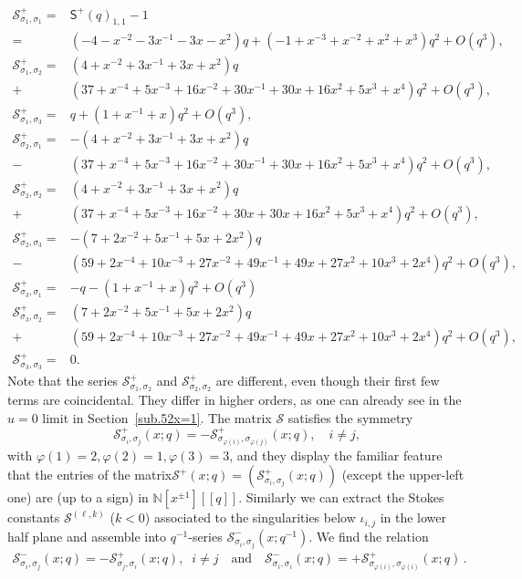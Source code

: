 \documentclass[12pt,reqno]{amsart}
\theoremstyle{definition}
\def\calS{\mathcal S}
\def\s{\sigma}
\def\mc{\mathcal}
\def\ms{\mathsf}
\def\cO{O}
\def\IN{\mathbb{N}}
\newcommand{\nn}{\nonumber \\}
\begin{document}
\begin{subequations}
\begin{align}
  \mc{S}^+_{\s_1,\s_1} =
  &\ms{S}^+(q)_{1,1}-1\nn=
  &(-4-x^{-2}-3x^{-1}-3 x-x^2) q+(-1+x^{-3}+x^{-2}+x^2+x^3) q^2+\cO(q^3),\\
  \mc{S}^+_{\s_1,\s_2} =
  &(4+x^{-2}+3x^{-1}+3 x+x^2) q\nn+
  &(37+x^{-4}+5x^{-3}+16x^{-2}+30x^{-1}+30 x+16 x^2+5 x^3+x^4) q^2+\cO(q^3),\\
  \mc{S}^+_{\s_1,\s_3} =
  &q+(1+x^{-1}+x) q^2+\cO(q^3),\\
  \mc{S}^+_{\s_2,\s_1} =
  &-(4+x^{-2}+3x^{-1}+3 x+x^2) q\nn-
  &(37+x^{-4}+5x^{-3}+16x^{-2}+30x^{-1}+30 x+16 x^2+5 x^3+x^4) q^2+\cO(q^3),\\
  \mc{S}^+_{\s_2,\s_2} =
  &(4+x^{-2}+3x^{-1}+3 x+x^2) q\nn+
  &(37+x^{-4}+5x^{-3}+16x^{-2}+30x+30 x+16 x^2+5 x^3+x^4) q^2+\cO(q^3),\\
  \mc{S}^+_{\s_2,\s_3} =
  &-(7+2x^{-2}+5x^{-1}+5 x+2 x^2) q\nn-
  &(59+2x^{-4}+10x^{-3}+27x^{-2}+49x^{-1}+49 x+27 x^2+10 x^3+2 x^4) q^2+\cO(q^3),\\
  \mc{S}^+_{\s_3,\s_1} =
  &-q-(1+x^{-1}+x) q^2+\cO(q^3)\\
  \mc{S}^+_{\s_3,\s_2} =
  &(7+2x^{-2}+5x^{-1}+5 x+2 x^2) q\nn+
  &(59+2x^{-4}+10x^{-3}+27x^{-2}+49x^{-1}+49 x+27 x^2+10 x^3+2 x^4) q^2+\cO(q^3),\\
  \mc{S}^+_{\s_3,\s_3} =
  &0.
\end{align}
\end{subequations}
Note that the series $\mc{S}^+_{\s_1,\s_2}$ and $\mc{S}^+_{\s_2,\s_2}$
are different, even though their first few terms are coincidental. They
differ in higher orders, as one can already see in the $u=0$ limit in
Section~\ref{sub.52x=1}. The matrix $\calS$ satisfies the symmetry
\begin{equation}
  \mc{S}^+_{\s_i,\s_j}(x;q) =
  -\mc{S}^+_{\s_{\varphi(i)},\s_{\varphi(j)}}(x;q),\quad i\neq j,
\end{equation}
with $\varphi(1)=2,\varphi(2)=1,\varphi(3)=3$, and they display the
familiar feature that the entries of the
matrix$\mc{S}^+(x;q)=(\mc{S}^+_{\s_i,\s_j}(x;q))$ (except the
upper-left one) are (up to a sign) in $\IN[x^{\pm 1}][[q]]$.
Similarly we can extract the Stokes constants
$\mc{S}^{(\ell,k)}$ ($k<0$) associated to the singularities below
$\iota_{i,j}$ in the lower half plane and assemble into
$q^{-1}$-series $\mc{S}^-_{\s_i,\s_j}(x;q^{-1})$.  We find the
relation
\begin{gather}
  \mc{S}^-_{\s_i,\s_j}(x;q) = -\mc{S}^+_{\s_j,\s_i}(x;q),\;\; i\neq
  j\quad\text{and}\quad
  \mc{S}^-_{\s_i,\s_i}(x;q) = +\mc{S}^+_{\s_{\varphi(i)},\s_{\varphi(i)}}(x;q)\,.
\end{gather}
\end{document}
